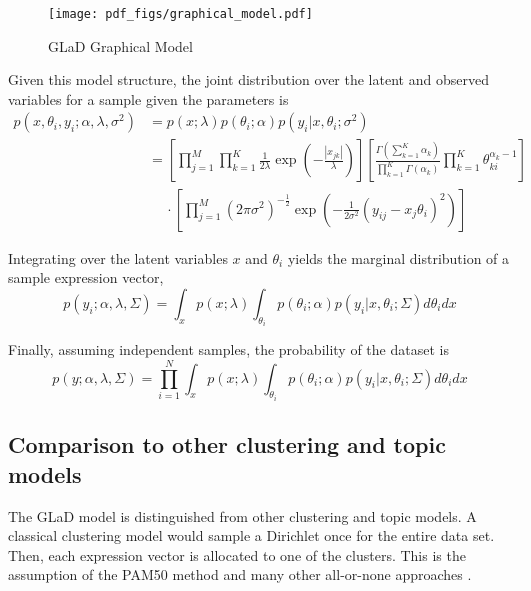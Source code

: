\documentclass[11pt]{amsart}
\begin{document}
\begin{figure}[h]
\begin{center}
\texttt{[image: pdf\_figs/graphical\_model.pdf]}
\caption{GLaD Graphical Model}
\label{fig:graphical_model}
\end{center}
\end{figure}

Given this model structure, the joint distribution over the latent and observed variables for a sample given the parameters is
\begin{equation}\label{eqn:jointpdf}
\begin{split}
p\left( x,  \theta_i, y_i; \alpha, \lambda, \sigma^2 \right) &= p\left( x ; \lambda \right) p\left( \theta_i ; \alpha \right) p\left( y_i | x, \theta_i ; \sigma^2 \right)\\
&=\left[ \prod_{j=1}^M \prod_{k=1}^K \frac{1}{2 \lambda} \exp \left( -\frac{|x_{jk}|}{\lambda} \right) \right]\left[ \frac{\Gamma\left( \sum_{k=1}^K \alpha_k \right)} { \prod_{k=1}^K \Gamma \left( \alpha_k \right)}
\prod_{k=1}^K \theta_{ki}^{\alpha_k - 1 } \right]\\
&\quad\ \cdot \left[ \prod_{j=1}^M \left( 2\pi \sigma^2 \right)^{ -\frac{1}{2} } \exp \left( -\frac{1}{2 \sigma^2 }\left( y_{ij} - x_j\theta_i \right)^2 \right)\right]
\end{split}
\end{equation}

Integrating over the latent variables $x$ and $\theta_i$ yields the marginal distribution of a sample expression vector,
\begin{equation}
p\left( y_i ; \alpha, \lambda, \Sigma \right) = \int_x p\left( x ; \lambda \right) \int_{\theta_i} p\left( \theta_i ; \alpha \right) p\left( y_i | x, \theta_i; \Sigma \right) d\theta_i dx
\end{equation}

Finally, assuming independent samples, the probability of the dataset is
\begin{equation}
p\left( y ; \alpha, \lambda, \Sigma \right) = \prod_{i=1}^N \int_x p\left( x ; \lambda \right) \int_{\theta_i} p\left( \theta_i ; \alpha \right) p\left( y_i | x, \theta_i; \Sigma \right) d\theta_i dx
\end{equation}

\subsection{Comparison to other clustering and topic models}
The GLaD model is distinguished from other clustering and topic models. A classical clustering model would sample a Dirichlet once for the entire data set. Then, each expression vector is allocated to one of the clusters. This is the assumption of the PAM50 method \cite{} and many other all-or-none approaches \cite{}. 
\end{document}
